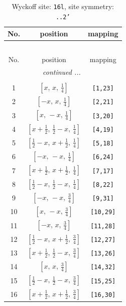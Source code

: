 \documentclass[fleqn,8pt]{jsarticle}
\begin{document}
\renewcommand{\arraystretch}{1.2}
\begin{longtable}{ccc}
\caption{Wyckoff site: {\tt 16l}, site symmetry: {\tt ..2'}}
 \\
 \hline \hline
No. & position & mapping \\ \hline \endfirsthead

\multicolumn{2}{l}{\tablename\ \thetable{}} \\
 \hline \hline
No. & position & mapping \\ \hline \endhead

 \hline \hline
\multicolumn{2}{r}{\footnotesize\it continued ...} \\ \endfoot

 \hline \hline
\multicolumn{2}{r}{} \\ \endlastfoot

1 & $\left[ x,\, x,\, \frac{1}{4} \right]$ & {\tt [1,23]} \\ \hline
2 & $\left[ - x,\, x,\, \frac{1}{4} \right]$ & {\tt [2,21]} \\ \hline
3 & $\left[ x,\, - x,\, \frac{1}{4} \right]$ & {\tt [3,20]} \\ \hline
4 & $\left[ x + \frac{1}{2},\, \frac{1}{2} - x,\, \frac{1}{4} \right]$ & {\tt [4,19]} \\ \hline
5 & $\left[ \frac{1}{2} - x,\, x + \frac{1}{2},\, \frac{1}{4} \right]$ & {\tt [5,18]} \\ \hline
6 & $\left[ - x,\, - x,\, \frac{1}{4} \right]$ & {\tt [6,24]} \\ \hline
7 & $\left[ x + \frac{1}{2},\, x + \frac{1}{2},\, \frac{1}{4} \right]$ & {\tt [7,17]} \\ \hline
8 & $\left[ \frac{1}{2} - x,\, \frac{1}{2} - x,\, \frac{1}{4} \right]$ & {\tt [8,22]} \\ \hline
9 & $\left[ - x,\, - x,\, \frac{3}{4} \right]$ & {\tt [9,31]} \\ \hline
10 & $\left[ x,\, - x,\, \frac{3}{4} \right]$ & {\tt [10,29]} \\ \hline
11 & $\left[ - x,\, x,\, \frac{3}{4} \right]$ & {\tt [11,28]} \\ \hline
12 & $\left[ \frac{1}{2} - x,\, x + \frac{1}{2},\, \frac{3}{4} \right]$ & {\tt [12,27]} \\ \hline
13 & $\left[ x + \frac{1}{2},\, \frac{1}{2} - x,\, \frac{3}{4} \right]$ & {\tt [13,26]} \\ \hline
14 & $\left[ x,\, x,\, \frac{3}{4} \right]$ & {\tt [14,32]} \\ \hline
15 & $\left[ \frac{1}{2} - x,\, \frac{1}{2} - x,\, \frac{3}{4} \right]$ & {\tt [15,25]} \\ \hline
16 & $\left[ x + \frac{1}{2},\, x + \frac{1}{2},\, \frac{3}{4} \right]$ & {\tt [16,30]} \\
\end{longtable}
\end{document}
